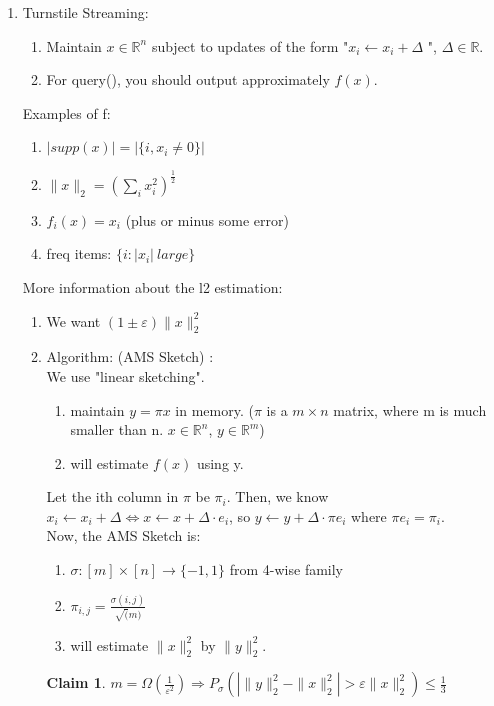 \documentclass[11pt]{article}
\newcommand{\R}{\mathbb R}
\newcommand{\eps}{\epsilon}
\renewcommand{\epsilon}{\varepsilon}
\newcommand{\<}{\langle}
\renewcommand{\>}{\rangle}
\theoremstyle{definition}
\numberwithin{problem}{section}
\newtheorem{claim}[theorem]{Claim}
\begin{document}
    \begin{enumerate}
    	\item Turnstile Streaming: 
        	\begin{enumerate}
            	\item Maintain $x \in \R^n$ subject to updates of the form "$x_i \leftarrow x_i + \Delta$ ", $\Delta \in \R$.
                \item For query(), you should output approximately $f(x)$.
            \end{enumerate}
            Examples of f:
            \begin{enumerate}
            	\item $|supp(x)| = |\{i, x_i \neq 0\}|$
                \item $\|x\|_2 = (\sum_{i}x_i^2)^{\frac{1}{2}}$
                \item $f_i(x) = x_i$ (plus or minus some error)
                \item freq items: $\{i:|x_i|\ large\}$
            \end{enumerate}
            More information about the l2 estimation:
            \begin{enumerate}
            	\item We want $(1\pm \eps)\|x\|_2^2$
                \item Algorithm: (AMS Sketch) \cite{ams-sketch}: \\
                	We use "linear sketching".
                    \begin{enumerate}
                    	\item maintain $y = \pi x$ in memory. ($\pi$ is a $m \times n$ matrix, where m is much smaller than n. $x \in \R^n$, $y \in \R^m$)
                        \item will estimate $f(x)$ using y.
                        
                    \end{enumerate}
                    Let the ith column in $\pi$ be $\pi_i$. Then, we know $x_i \leftarrow x_i + \Delta \Leftrightarrow x \leftarrow x + \Delta \cdot e_i$, so $y \leftarrow y + \Delta \cdot \pi e_i$ where $\pi e_i = \pi_i$. \\
                    Now, the AMS Sketch is:
                    \begin{enumerate}
                    	\item $\sigma: [m] \times [n] \rightarrow \{-1,1\}$ from 4-wise family
                        \item $\pi_{i,j} = \frac{\sigma(i,j)}{\sqrt(m)}$
                        \item will estimate $\|x\|_2^2$ by $\|y\|_2^2$. 
                    \end{enumerate}
                    \begin{claim}
                    	$m = \Omega(\frac{1}{\eps^2}) \Rightarrow P_{\sigma}(|\|y\|_2^2 - \|x\|_2^2| > \eps \|x\|_2^2) \leq \frac{1}{3}$
                    \end{claim}
            \end{enumerate}
    \end{enumerate}
\end{document}
